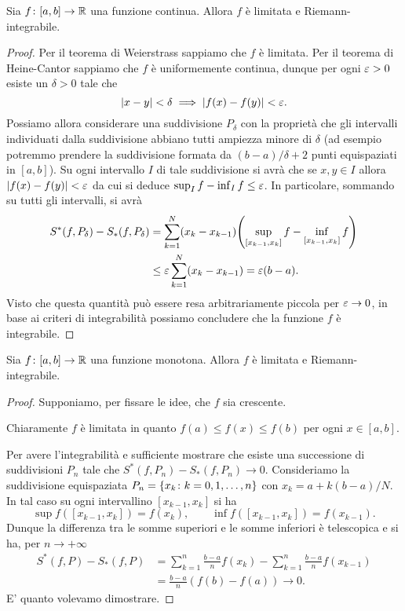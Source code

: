 \begin{theorem}
\mymark{***}
\label{th:integrabilita_continue}
Sia $f\colon [a,b]\to {\mathbb R}$ una funzione continua.
Allora $f$ è limitata e Riemann-integrabile.
\end{theorem}
%
\begin{proof}
\mymark{***}
Per il teorema di Weierstrass sappiamo che $f$ è limitata.
Per il teorema di Heine-Cantor sappiamo che $f$ è uniformemente continua,
dunque per ogni $\varepsilon>0$ esiste un $\delta>0$ tale che
\[
 {\left|x-y\right|} < \delta \implies {\left|f(x)-f(y)\right|} < \varepsilon.
\]
Possiamo allora considerare una suddivisione $P_\delta$ con la proprietà che
gli intervalli individuati dalla suddivisione abbiano tutti ampiezza minore di
$\delta$ (ad esempio potremmo prendere la suddivisione formata da
$(b-a)/\delta+2$ punti equispaziati in $[a,b]$). Su ogni intervallo $I$ di tale
suddivisione si avrà che se $x,y\in I$ allora ${\left|f(x)-f(y)\right|} < \varepsilon$ da cui
si deduce $\sup_I f - \inf_I f \le \varepsilon$.
In particolare, sommando su tutti gli intervalli, si avrà
\begin{align*}
  S^*(f,P_\delta) - S_*(f,P_\delta)
  &= \sum_{k=1}^N (x_k-x_{k-1}){\left( \sup_{[x_{k-1},x_k]} f - \inf_{[x_{k-1},x_k]} f \right)} \\
  &\le \varepsilon \sum_{k=1}^N (x_k - x_{k-1})
   = \varepsilon (b-a).
\end{align*}
Visto che questa quantità può essere resa arbitrariamente piccola per
$\varepsilon \to 0$, in base ai criteri di integrabilità possiamo concludere che la
funzione $f$ è integrabile.
\end{proof}

\begin{theorem}
\label{th:integrabilita_monotone}%
%
%
Sia $f\colon [a,b]\to {\mathbb R}$ una funzione monotona. Allora $f$ è limitata e
Riemann-integrabile.
\end{theorem}
%
\begin{proof}
Supponiamo, per fissare le idee, che $f$ sia crescente.

Chiaramente $f$ è limitata in quanto $f(a) \le f(x) \le f(b)$ per ogni
$x\in [a,b]$.

Per avere l'integrabilità e sufficiente mostrare
che esiste una successione di suddivisioni $P_n$
tale che $S^*(f,P_n) - S_*(f,P_n) \to 0$.
Consideriamo la suddivisione equispaziata
$P_n={\left\{ x_k \colon k=0,1, \dots, n \right\}}$ con $x_k=a+k(b-a)/N$.
In tal caso su ogni intervallino $[x_{k-1},x_k]$ si ha
\[
  \sup f([x_{k-1}, x_k]) = f(x_k),
  \qquad
  \inf f([x_{k-1}, x_k]) = f(x_{k-1}).
\]
Dunque la differenza tra le somme superiori
e le somme inferiori è telescopica
e si ha, per $n\to +\infty$
\begin{align*}
S^*(f,P) - S_*(f,P)
&= \sum_{k=1}^n \frac{b-a}{n} f(x_k)
  - \sum_{k=1}^n \frac{b-a}{n} f(x_{k-1}) \\
&= \frac{b-a}{n}(f(b)-f(a)) \to 0.
\end{align*}
E' quanto volevamo dimostrare.
\end{proof}

